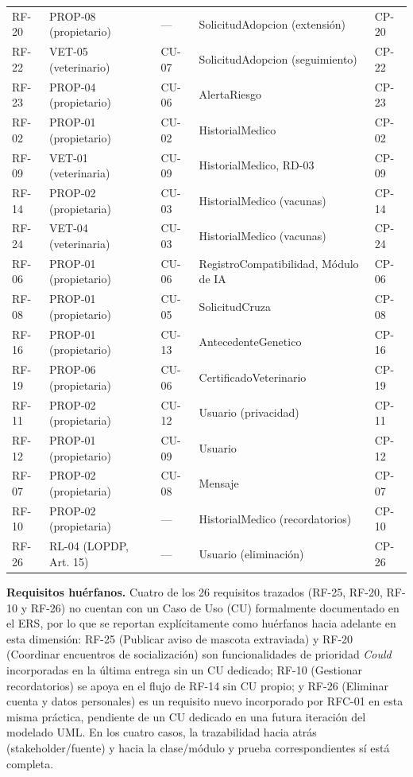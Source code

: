 \documentclass[journal,onecolumn]{IEEEtran}
\begin{document}
\begin{longtable}{@{}l l l p{4.2cm} l@{}}
		RF-20 & PROP-08 (propietario) & --- & SolicitudAdopcion (extensión) & CP-20 \\
		RF-22 & VET-05 (veterinario) & CU-07 & SolicitudAdopcion (seguimiento) & CP-22 \\
		RF-23 & PROP-04 (propietario) & CU-06 & AlertaRiesgo & CP-23 \\
		RF-02 & PROP-01 (propietario) & CU-02 & HistorialMedico & CP-02 \\
		RF-09 & VET-01 (veterinaria) & CU-09 & HistorialMedico, RD-03 & CP-09 \\
		RF-14 & PROP-02 (propietaria) & CU-03 & HistorialMedico (vacunas) & CP-14 \\
		RF-24 & VET-04 (veterinaria) & CU-03 & HistorialMedico (vacunas) & CP-24 \\
		RF-06 & PROP-01 (propietario) & CU-06 & RegistroCompatibilidad, Módulo de IA & CP-06 \\
		RF-08 & PROP-01 (propietario) & CU-05 & SolicitudCruza & CP-08 \\
		RF-16 & PROP-01 (propietario) & CU-13 & AntecedenteGenetico & CP-16 \\
		RF-19 & PROP-06 (propietaria) & CU-06 & CertificadoVeterinario & CP-19 \\
		RF-11 & PROP-02 (propietaria) & CU-12 & Usuario (privacidad) & CP-11 \\
		RF-12 & PROP-01 (propietario) & CU-09 & Usuario & CP-12 \\
		RF-07 & PROP-02 (propietaria) & CU-08 & Mensaje & CP-07 \\
		RF-10 & PROP-02 (propietaria) & --- & HistorialMedico (recordatorios) & CP-10 \\
		RF-26 & RL-04 (LOPDP, Art. 15) & --- & Usuario (eliminación) & CP-26 \\
		\bottomrule
	\end{longtable}
	
	\textbf{Requisitos huérfanos.} Cuatro de los 26 requisitos trazados (RF-25, RF-20, RF-10 y RF-26) no cuentan con un Caso de Uso (CU) formalmente documentado en el ERS, por lo que se reportan explícitamente como huérfanos hacia adelante en esta dimensión: RF-25 (Publicar aviso de mascota extraviada) y RF-20 (Coordinar encuentros de socialización) son funcionalidades de prioridad \textit{Could} incorporadas en la última entrega sin un CU dedicado; RF-10 (Gestionar recordatorios) se apoya en el flujo de RF-14 sin CU propio; y RF-26 (Eliminar cuenta y datos personales) es un requisito nuevo incorporado por RFC-01 en esta misma práctica, pendiente de un CU dedicado en una futura iteración del modelado UML. En los cuatro casos, la trazabilidad hacia atrás (stakeholder/fuente) y hacia la clase/módulo y prueba correspondientes sí está completa.
	
\end{document}
